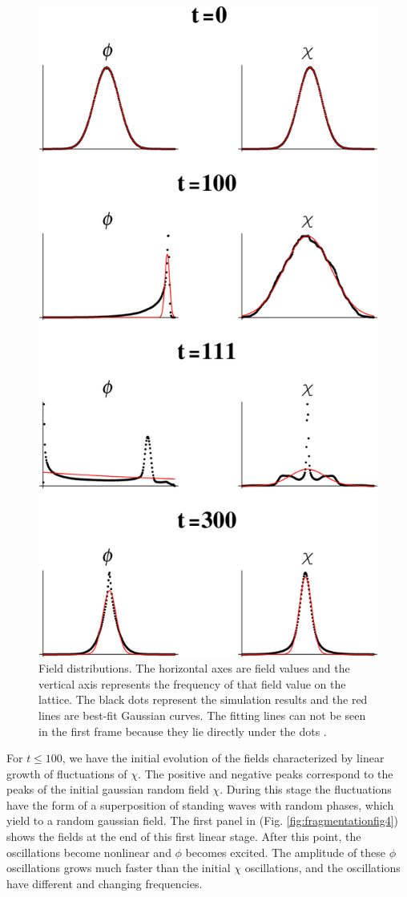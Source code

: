 \documentclass[11pt,a4paper,twoside]{book}
\begin{document}
\begin{figure}[h]
	\centering
	\includegraphics[width=0.6\linewidth, height=0.5\textheight]{Images/Chap5/Fragmentation_Fig6}
	\caption{Field distributions. The horizontal axes are field values and the vertical axis represents the frequency of that field value on the lattice. The black dots represent the simulation results and the red lines are best-fit Gaussian curves. The fitting lines can not be seen in the first frame  because they lie directly under the dots \cite{Chap5:Fragmentation}.}
	\label{fig:fragmentationfig6}
\end{figure}
For $ t \le 100 $, we have the initial evolution of the fields characterized by linear growth of fluctuations of $\chi$. The positive and negative peaks correspond to the peaks  of the initial gaussian random field $\chi$. During this stage the fluctuations have the form of a superposition of standing waves with random phases, which yield to a random gaussian field. The first panel in (Fig. \ref{fig:fragmentationfig4}) shows the fields at the end of this first linear stage. After this point, the oscillations become nonlinear and $\phi$ becomes excited. The amplitude of these $\phi$ oscillations grows much faster than the initial $\chi$ oscillations, and the oscillations have different and changing frequencies.
\end{document}
